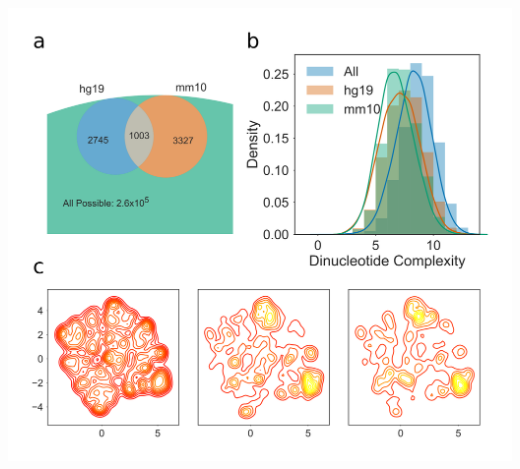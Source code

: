\documentclass[12pt,a4paper,]{report}
\let\origfigure=\figure
\let\endorigfigure=\endfigure
\renewenvironment{figure}[1][2] {
    \expandafter\origfigure\expandafter[H]
} {
    \endorigfigure
}
\begin{document}
\begin{figure}[htbp]
\centering
\includegraphics[width=\textwidth,height=562pt,keepaspectratio]{chapter_3/figures/g4_space.png}
\caption[Human and mouse genomes contain different G4 subpopulations]{\textbf{Human   and   mouse   genomes   contain   different   G4   subpopulations}   \textbf{a)}   Venn   diagram   showing   overlap   of   3   tetrad   Quadparser   motifs   populations   with   loop   lengths   of   3bp   in   the   human   (hg19)   and   mouse   (mm10)   genomes,   compared   to   all   possible   sequences.   \textbf{b)}   Histogram   and   kernel   density   estimate   of   dinucleotide   complexity   for   human,   mouse   and   all   possible   3   tetrad   Quadparser   motifs   with   loop   length   of   3bp.   \textbf{c)}   2D   Kernel   density   estimate   plot   showing   distribution   of   all   possible   tetrad   Quadparser   motifs   (left),   those   found   in   the   human   genome   (centre)   and   those   found   in   the   mouse   genome.   Dimensionality   reduction   was   conducted   using   UMAP   with   Hamming   distance   as   the   metric.   \label{g4_space}}
\end{figure}
\end{document}
